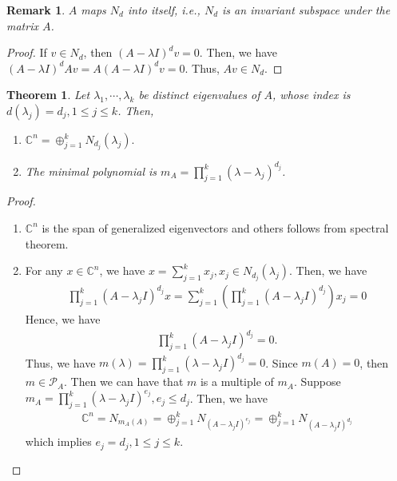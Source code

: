 \documentclass[11pt]{book}
\newtheorem{theorem}{Theorem}[section]
\newtheorem{remark}{Remark}[section]
\theoremstyle{definition}
\numberwithin{equation}{subsection}
\begin{document}
\medskip

\begin{remark}
$A$ maps $N_d$ into itself, i.e., $N_d$ is an invariant subspace under the matrix $A$.
\end{remark}
\begin{proof}
If $v\in N_d$, then $(A - \lambda I)^d v = 0$. Then, we have $(A - \lambda I)^d Av = A(A - \lambda I)^d v = 0$. Thus, $Av \in N_d$.
\end{proof}

\medskip

\begin{theorem}
Let $\lambda_1,\cdots,\lambda_k$ be distinct eigenvalues of $A$, whose index is $d\left(\lambda_j\right) = d_j, 1\leq j \leq k$. Then,
\begin{enumerate}[label=(\arabic*)]
    \item $\mathbb{C}^n = \oplus^k_{j=1}N_{d_j}(\lambda_j).$
    \item The minimal polynomial is $m_A = \prod^k_{j=1}\left(\lambda - \lambda_j \right)^{d_j}$.
\end{enumerate}
\end{theorem}
\begin{proof}
~\begin{enumerate}[label=(\arabic*)]
    \item $\mathbb{C}^n$ is the span of generalized eigenvectors and others follows from spectral theorem.
    \item For any $x\in\mathbb{C}^n$, we have $x = \sum^k_{j=1}x_j, x_j\in N_{d_j}(\lambda_j)$. Then, we have 
    \begin{align*}
        \prod^k_{j=1} \left(A - \lambda_j I\right)^{d_j}x = \sum^k_{j=1}\left(\prod^k_{j=1} \left(A - \lambda_j I\right)^{d_j} \right)x_j = 0
    \end{align*}
    Hence, we have 
    \begin{align*}
        \prod^k_{j=1} \left(A - \lambda_j I\right)^{d_j} = 0.
    \end{align*}
    Thus, we have $m(\lambda) = \prod^k_{j=1} \left(\lambda - \lambda_j I\right)^{d_j} = 0$. Since $m(A) = 0$, then $m\in \mathcal{P}_A$. Then we can have that $m$ is a multiple of $m_A$. Suppose $m_A = \prod^k_{j=1} \left(\lambda - \lambda_j I\right)^{e_j}, e_j\leq d_j$. Then, we have 
    \begin{align*}
        \mathbb{C}^n = N_{m_A(A)} = \oplus^k_{j=1}N_{(A-\lambda_j I)^{e_j}} = \oplus^k_{j=1}N_{(A-\lambda_j I)^{d_j}}
    \end{align*}
    which implies $e_j = d_j, 1\leq j \leq k$.
\end{enumerate}
\end{proof}
\end{document}
